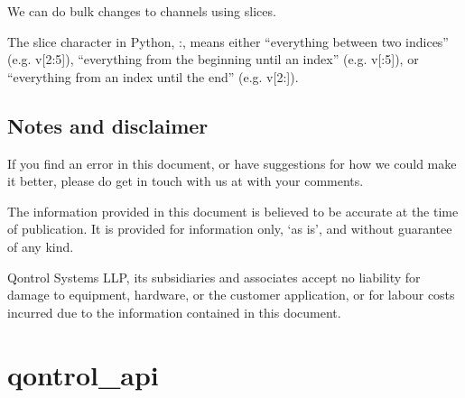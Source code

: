 \documentclass[letterpaper,10pt,english]{sphinxmanual}
\begin{document}
%
\begin{sphinxVerbatim}[commandchars=\\\{\}]
\PYG{p}{[}\PYG{p}{]}  
  \PYG{p}{[}\PYG{p}{]}
\end{sphinxVerbatim}

We can do bulk changes to channels using slices.

%
\begin{sphinxVerbatim}[commandchars=\\\{\}]
\PYG{p}{[}\PYG{p}{]}  
  \PYG{p}{[}\PYG{p}{]}
\end{sphinxVerbatim}

The slice character in Python, :, means either “everything between two indices” (e.g. v{[}2:5{]}), “everything from the beginning until an index” (e.g. v{[}:5{]}), or “everything from an index until the end” (e.g. v{[}2:{]}).


\section{Notes and disclaimer}
\label{\detokenize{guide/getting_started:notes-and-disclaimer}}
If you find an error in this document, or have suggestions for how we could make it better, please do get in touch with us at  with your comments.

The information provided in this document is believed to be accurate at the time of publication. It is provided for information only, ‘as is’, and without guarantee of any kind.

Qontrol Systems LLP, its subsidiaries and associates accept no liability for damage to equipment, hardware, or the customer application, or for labour costs incurred due to the information contained in this document.


\chapter{qontrol\_api}
\label{\detokenize{modules:qontrol-api}}\label{\detokenize{modules::doc}}
\end{document}
